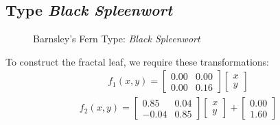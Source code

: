 \documentclass{article}
\begin{document}
\subsection{Type \textit{Black Spleenwort}}
\begin{figure}[H]
\centering 
\noindent{}%
\caption{Barnsley's Fern Type: \textit{Black Spleenwort}}
\end{figure}
To construct the fractal leaf, we require these transformations:
\begin{gather}
f_1(x, y)=\begin{bmatrix}0.00 & 0.00 \\ 0.00 & 0.16 \end{bmatrix}\begin{bmatrix}x\\y\end{bmatrix}
\end{gather}
\begin{gather}
f_2(x, y)=\begin{bmatrix}0.85 & 0.04 \\ -0.04 & 0.85 \end{bmatrix}\begin{bmatrix}x\\y\end{bmatrix} + \begin{bmatrix}0.00\\1.60\end{bmatrix}
\end{gather}
\end{document}
